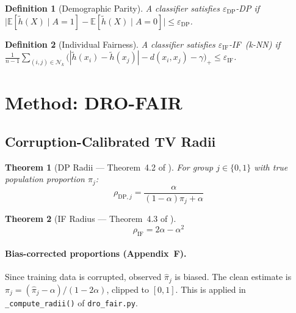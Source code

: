 \documentclass[11pt,a4paper]{article}
\newtheorem{theorem}{Theorem}
\newtheorem{definition}{Definition}
\newcommand{\E}{\mathbb{E}}
\newcommand{\htilde}{\tilde{h}}
\newcommand{\rDP}[1][]{\rho_{\mathrm{DP}#1}}
\newcommand{\rIF}{\rho_{\mathrm{IF}}}
\begin{document}
\begin{definition}[Demographic Parity]
A classifier satisfies $\varepsilon_{\mathrm{DP}}$-DP if
$\bigl|\E[\htilde(X)\mid A=1] - \E[\htilde(X)\mid A=0]\bigr| \le \varepsilon_{\mathrm{DP}}$.
\end{definition}

\begin{definition}[Individual Fairness]
A classifier satisfies $\varepsilon_{\mathrm{IF}}$-IF~(k-NN) if
$\frac{1}{n-1}\sum_{(i,j)\in\mathcal{N}_k}
\bigl(|\htilde(x_i)-\htilde(x_j)| - d(x_i,x_j)-\gamma\bigr)_+
\le \varepsilon_{\mathrm{IF}}$.
\end{definition}

\section{Method: DRO-FAIR}

\subsection{Corruption-Calibrated TV Radii}

\begin{theorem}[DP Radii --- Theorem~4.2 of \citealt{drofair2026}]
For group $j\in\{0,1\}$ with true population proportion $\pi_j$:
\begin{equation}
  \rDP[{,j}] = \frac{\alpha}{(1-\alpha)\pi_j + \alpha}
  \label{eq:dp_radius}
\end{equation}
\end{theorem}

\begin{theorem}[IF Radius --- Theorem~4.3 of \citealt{drofair2026}]
\begin{equation}
  \rIF = 2\alpha - \alpha^2
  \label{eq:if_radius}
\end{equation}
\end{theorem}

\paragraph{Bias-corrected proportions (Appendix~F).}
Since training data is corrupted, observed $\hat{\pi}_j$ is biased.
The clean estimate is $\pi_j = (\hat{\pi}_j - \alpha)/(1-2\alpha)$,
clipped to $[0,1]$.  This is applied in \texttt{\_compute\_radii()} of
\texttt{dro\_fair.py}.
\end{document}
